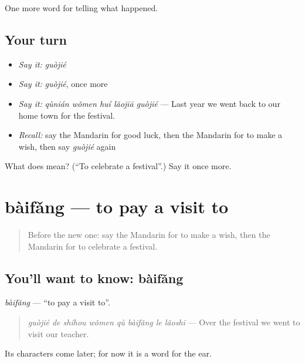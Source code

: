 \begin{grammarlens}[title={What you've built}]
One more word for telling what happened.
\end{grammarlens}

\subsection*{Your turn}
\begin{itemize}
\raggedright
  \item \emph{Say it:} \emph{guòjié}
  \item \emph{Say it:} \emph{guòjié}, once more
  \item \emph{Say it:} \emph{qùnián wǒmen huí lǎojiā guòjié} — Last year we went back to our home town for the festival.
  \item \emph{Recall:} say the Mandarin for good luck, then the Mandarin for to make a wish, then say \emph{guòjié} again
\end{itemize}

\begin{tcolorbox}[breakable,colback=teal!4,colframe=teal!35!black,title={Before you move on}]
What does  mean? (\textquotedblleft{}To celebrate a festival\textquotedblright{}.) Say it once more.
\end{tcolorbox}
\section[bàifǎng]{bàifǎng — to pay a visit to}

\label{lesson:ZH-C338-baifang}



\begin{quote}
Before the new one: say the Mandarin for to make a wish, then the Mandarin for to celebrate a festival.
\end{quote}

\subsection*{You'll want to know: bàifǎng}
\emph{bàifǎng} — \textquotedblleft{}to pay a visit to\textquotedblright{}.

\begin{quote}
\emph{guòjié de shíhou wǒmen qù bàifǎng le lǎoshī} — Over the festival we went to visit our teacher.
\end{quote}

Its characters come later; for now it is a word for the ear.

